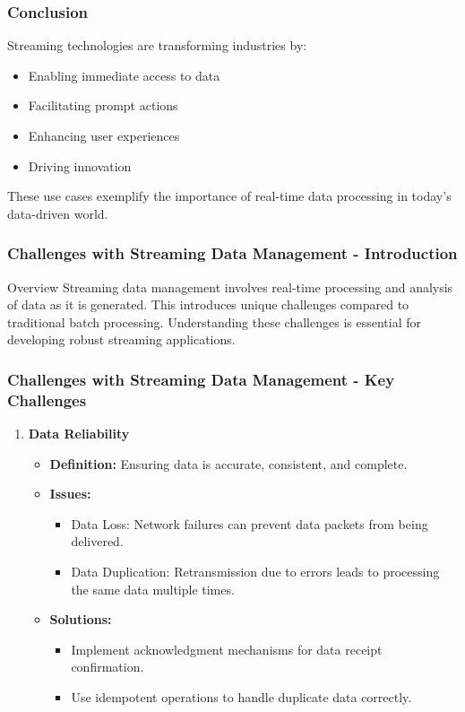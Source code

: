\documentclass[aspectratio=169]{beamer}
\begin{document}
\begin{frame}[fragile]
    \frametitle{Conclusion}
    Streaming technologies are transforming industries by:
    \begin{itemize}
        \item Enabling immediate access to data
        \item Facilitating prompt actions
        \item Enhancing user experiences
        \item Driving innovation
    \end{itemize}
    These use cases exemplify the importance of real-time data processing in today's data-driven world.
\end{frame}

\begin{frame}[fragile]
    \frametitle{Challenges with Streaming Data Management - Introduction}
    \begin{block}{Overview}
        Streaming data management involves real-time processing and analysis of data as it is generated. This introduces unique challenges compared to traditional batch processing. Understanding these challenges is essential for developing robust streaming applications.
    \end{block}
\end{frame}

\begin{frame}[fragile]
    \frametitle{Challenges with Streaming Data Management - Key Challenges}
    \begin{enumerate}
        \item \textbf{Data Reliability}
        \begin{itemize}
            \item \textbf{Definition:} Ensuring data is accurate, consistent, and complete.
            \item \textbf{Issues:}
            \begin{itemize}
                \item Data Loss: Network failures can prevent data packets from being delivered.
                \item Data Duplication: Retransmission due to errors leads to processing the same data multiple times.
            \end{itemize}
            \item \textbf{Solutions:}
            \begin{itemize}
                \item Implement acknowledgment mechanisms for data receipt confirmation.
                \item Use idempotent operations to handle duplicate data correctly.
            \end{itemize} 
        \end{itemize}
    \end{enumerate}
\end{frame}
\end{document}
